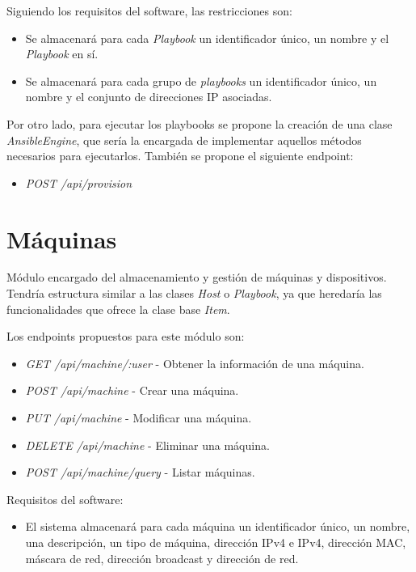 Siguiendo los requisitos del software, las restricciones son:
\begin{itemize}
	\item Se almacenará para cada \textit{Playbook} un identificador único, un nombre y el \textit{Playbook} en sí.
	\item Se almacenará para cada grupo de \textit{playbooks} un identificador único, un nombre y el conjunto de direcciones IP asociadas.
\end{itemize}

\bigskip
Por otro lado, para ejecutar los playbooks se propone la creación de una clase \textit{AnsibleEngine}, que sería la encargada de implementar aquellos métodos necesarios para ejecutarlos. También se propone el siguiente endpoint:
\begin{itemize}
	\item \textit{POST /api/provision}
\end{itemize}




\section{Máquinas}

Módulo encargado del almacenamiento y gestión de máquinas y dispositivos. Tendría estructura similar a las clases \textit{Host} o \textit{Playbook}, ya que heredaría las funcionalidades que ofrece la clase base \textit{Item}.

\bigskip
Los endpoints propuestos para este módulo son:
\begin{itemize}
	\item \textit{GET /api/machine/:user} - Obtener la información de una máquina.
	\item \textit{POST /api/machine} - Crear una máquina.
	\item \textit{PUT /api/machine} - Modificar una máquina.
	\item \textit{DELETE /api/machine} - Eliminar una máquina.
	\item \textit{POST /api/machine/query} - Listar máquinas.
\end{itemize}



\bigskip
Requisitos del software:
\begin{itemize}
	\item El sistema almacenará para cada máquina un identificador único, un nombre, una descripción, un tipo de máquina, dirección IPv4 e IPv4, dirección MAC, máscara de red, dirección broadcast y dirección de red.
\end{itemize}





